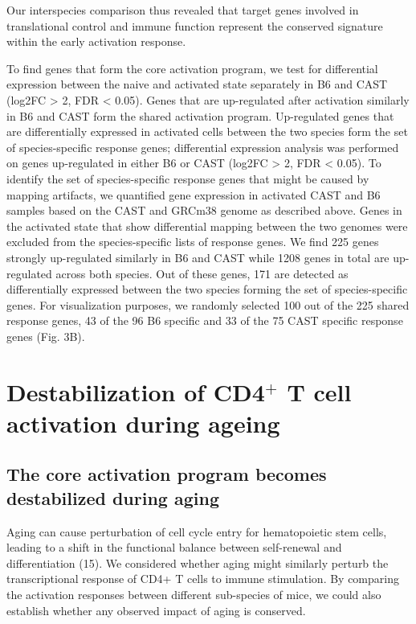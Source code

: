 Our interspecies comparison thus revealed that target genes involved in translational control and immune function represent the conserved signature within the early activation response.

To find genes that form the core activation program, we test for differential expression between the naive and activated state separately in B6 and CAST (log2FC > 2, FDR < 0.05). Genes that are up-regulated after activation similarly in B6 and CAST form the shared activation program. Up-regulated genes that are differentially expressed in activated cells between the two species form the set of species-specific response genes; differential expression analysis was performed on genes up-regulated in either B6 or CAST (log2FC > 2, FDR < 0.05). To identify the set of species-specific response genes that might be caused by mapping artifacts, we quantified gene expression in activated CAST and B6 samples based on the CAST and GRCm38 genome as described above. Genes in the activated state that show differential mapping between the two genomes were excluded from the species-specific lists of response genes. We find 225 genes strongly up-regulated similarly in B6 and CAST while 1208 genes in total are up-regulated across both species. Out of these genes, 171 are detected as differentially expressed between the two species forming the set of species-specific genes. For visualization purposes, we randomly selected 100 out of the 225 shared response genes, 43 of the 96 B6 specific and 33 of the 75 CAST specific response genes (Fig. 3B).

\section{Destabilization of CD4$^+$ T cell activation during ageing}
\subsection*{The core activation program becomes destabilized during aging}

Aging can cause perturbation of cell cycle entry for hematopoietic stem cells, leading to a shift in the functional balance between self-renewal and differentiation (15). We considered whether aging might similarly perturb the transcriptional response of CD4+ T cells to immune stimulation. By comparing the activation responses between different sub-species of mice, we could also establish whether any observed impact of aging is conserved.

